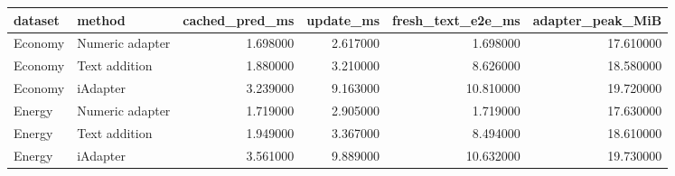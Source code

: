 \begin{tabular}{llrrrr}
\toprule
dataset & method & cached\_pred\_ms & update\_ms & fresh\_text\_e2e\_ms & adapter\_peak\_MiB \\
\midrule
Economy & Numeric adapter & 1.698000 & 2.617000 & 1.698000 & 17.610000 \\
Economy & Text addition & 1.880000 & 3.210000 & 8.626000 & 18.580000 \\
Economy & iAdapter & 3.239000 & 9.163000 & 10.810000 & 19.720000 \\
Energy & Numeric adapter & 1.719000 & 2.905000 & 1.719000 & 17.630000 \\
Energy & Text addition & 1.949000 & 3.367000 & 8.494000 & 18.610000 \\
Energy & iAdapter & 3.561000 & 9.889000 & 10.632000 & 19.730000 \\
\bottomrule
\end{tabular}
